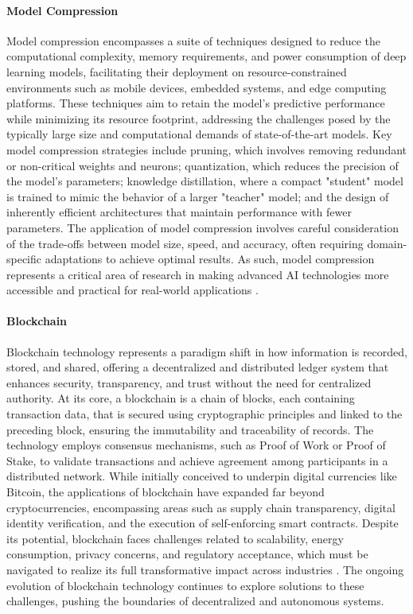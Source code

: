 \documentclass{article}
\begin{document}
\paragraph{Model Compression}
Model compression encompasses a suite of techniques designed to reduce the computational complexity, memory requirements, and power consumption of deep learning models, facilitating their deployment on resource-constrained environments such as mobile devices, embedded systems, and edge computing platforms. These techniques aim to retain the model's predictive performance while minimizing its resource footprint, addressing the challenges posed by the typically large size and computational demands of state-of-the-art models. Key model compression strategies include pruning, which involves removing redundant or non-critical weights and neurons; quantization, which reduces the precision of the model's parameters; knowledge distillation, where a compact "student" model is trained to mimic the behavior of a larger "teacher" model; and the design of inherently efficient architectures that maintain performance with fewer parameters. The application of model compression involves careful consideration of the trade-offs between model size, speed, and accuracy, often requiring domain-specific adaptations to achieve optimal results. As such, model compression represents a critical area of research in making advanced AI technologies more accessible and practical for real-world applications \cite{ChengEtAl2017, HintonVinyalsDean2015}.

\paragraph{Blockchain}
Blockchain technology represents a paradigm shift in how information is recorded, stored, and shared, offering a decentralized and distributed ledger system that enhances security, transparency, and trust without the need for centralized authority. At its core, a blockchain is a chain of blocks, each containing transaction data, that is secured using cryptographic principles and linked to the preceding block, ensuring the immutability and traceability of records. The technology employs consensus mechanisms, such as Proof of Work or Proof of Stake, to validate transactions and achieve agreement among participants in a distributed network. While initially conceived to underpin digital currencies like Bitcoin, the applications of blockchain have expanded far beyond cryptocurrencies, encompassing areas such as supply chain transparency, digital identity verification, and the execution of self-enforcing smart contracts. Despite its potential, blockchain faces challenges related to scalability, energy consumption, privacy concerns, and regulatory acceptance, which must be navigated to realize its full transformative impact across industries \cite{Nakamoto2008, Swan2015}. The ongoing evolution of blockchain technology continues to explore solutions to these challenges, pushing the boundaries of decentralized and autonomous systems.
\end{document}
